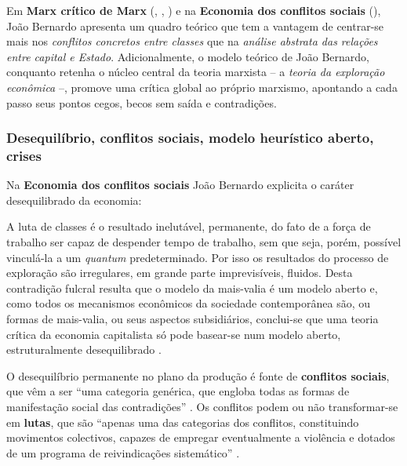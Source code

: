 Em \textbf{Marx crítico de Marx} (\citeyear{BERNARDO1977a}, \citeyear{BERNARDO1977b}, \citeyear{BERNARDO1977c}) e na \textbf{Economia dos conflitos sociais} (\citeyear{BERNARDO1991}), João Bernardo apresenta um quadro teórico que tem a vantagem de centrar-se mais nos \textit{conflitos concretos entre classes} que na \textit{análise abstrata das relações entre capital e Estado}. Adicionalmente, o modelo teórico de João Bernardo, conquanto retenha o núcleo central da teoria marxista -- a \textit{teoria da exploração econômica} --, promove uma crítica global ao próprio marxismo, apontando a cada passo seus pontos cegos, becos sem saída e contradições.

\subsubsection{Desequilíbrio, conflitos sociais, modelo heurístico aberto, crises}\label{subsubsec:desecsmodheuracr}

Na \textbf{Economia dos conflitos sociais} João Bernardo explicita o caráter desequilibrado da economia:

\begin{citacao}
A luta de classes é o resultado inelutável, permanente, do fato de a força de trabalho ser capaz de despender tempo de trabalho, sem que seja, porém, possível vinculá-la a um \textit{quantum} predeterminado. Por isso os resultados do processo de exploração são irregulares, em grande parte imprevisíveis, fluidos. Desta contradição fulcral resulta que o modelo da mais-valia é um modelo aberto e, como todos os mecanismos econômicos da sociedade contemporânea são, ou formas de mais-valia, ou seus aspectos subsidiários, conclui-se que uma teoria crítica da economia capitalista só pode basear-se num modelo aberto, estruturalmente desequilibrado \cite[p.~62]{BERNARDO1991}. 
\end{citacao}

O desequilíbrio permanente no plano da produção é fonte de \textbf{conflitos sociais}, que vêm a ser ``uma categoria genérica, que engloba todas as formas de manifestação social das contradições'' \cite[p.~10]{BERNARDO1997}. Os conflitos podem ou não transformar-se em \textbf{lutas}, que são ``apenas uma das categorias dos conflitos, constituindo movimentos colectivos, capazes de empregar eventualmente a violência e dotados de um programa de reivindicações sistemático'' \cite[p.~10]{BERNARDO1997}. 

